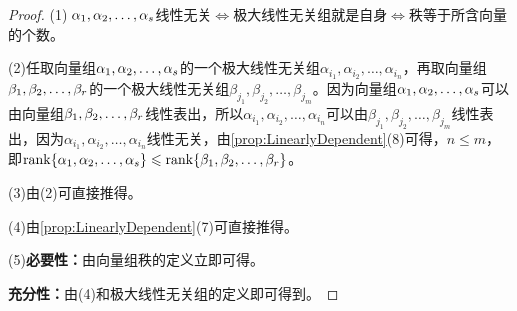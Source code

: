 \begin{proof}
	(1)$\;\alpha_1, \alpha_2, \dots, \alpha_{s}$线性无关$\iff$极大线性无关组就是自身$\iff$秩等于所含向量的个数。\par
	(2)任取向量组$\alpha_1, \alpha_2, \dots, \alpha_{s}$的一个极大线性无关组$\alpha_{i_1},\alpha_{i_2},\dots,\alpha_{i_n}$，再取向量组$\beta_1, \beta_2, \dots, \beta_{r}$的一个极大线性无关组$\beta_{j_1},\beta_{j_2},\dots,\beta_{j_m}$。因为向量组$\alpha_1, \alpha_2, \dots, \alpha_{s}$可以由向量组$\beta_1, \beta_2, \dots, \beta_{r}$线性表出，所以$\alpha_{i_1},\alpha_{i_2},\dots,\alpha_{i_n}$可以由$\beta_{j_1},\beta_{j_2},\dots,\beta_{j_m}$线性表出，因为$\alpha_{i_1},\alpha_{i_2},\dots,\alpha_{i_n}$线性无关，由\cref{prop:LinearlyDependent}(8)可得，$n\leqslant m$，即$\operatorname{rank}\{\alpha_1, \alpha_2, \dots, \alpha_{s}\}\leqslant\operatorname{rank}\{\beta_1, \beta_2, \dots, \beta_{r}\}$。\par
	(3)由(2)可直接推得。\par
	(4)由\cref{prop:LinearlyDependent}(7)可直接推得。\par
	(5)\textbf{必要性：}由向量组秩的定义立即可得。\par
	\textbf{充分性：}由(4)和极大线性无关组的定义即可得到。
\end{proof}
